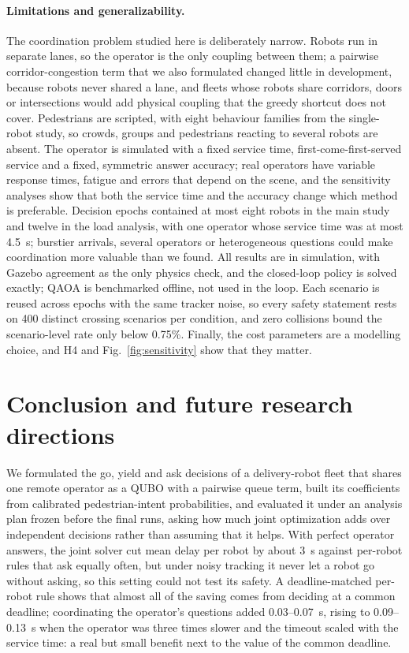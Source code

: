 \documentclass[a4paper,fleqn]{cas-dc}
\begin{document}
\paragraph{Limitations and generalizability.} The coordination problem studied here is deliberately narrow. Robots run in separate lanes, so the operator is the only coupling between them; a pairwise corridor-congestion term that we also formulated changed little in development, because robots never shared a lane, and fleets whose robots share corridors, doors or intersections would add physical coupling that the greedy shortcut does not cover. Pedestrians are scripted, with eight behaviour families from the single-robot study, so crowds, groups and pedestrians reacting to several robots are absent. The operator is simulated with a fixed service time, first-come-first-served service and a fixed, symmetric answer accuracy; real operators have variable response times, fatigue and errors that depend on the scene, and the sensitivity analyses show that both the service time and the accuracy change which method is preferable. Decision epochs contained at most eight robots in the main study and twelve in the load analysis, with one operator whose service time was at most \SI{4.5}{s}; burstier arrivals, several operators or heterogeneous questions could make coordination more valuable than we found. All results are in simulation, with Gazebo agreement as the only physics check, and the closed-loop policy is solved exactly; QAOA is benchmarked offline, not used in the loop. Each scenario is reused across epochs with the same tracker noise, so every safety statement rests on 400 distinct crossing scenarios per condition, and zero collisions bound the scenario-level rate only below 0.75\%. Finally, the cost parameters are a modelling choice, and H4 and Fig.~\ref{fig:sensitivity} show that they matter.

\section{Conclusion and future research directions}
\label{sec:conclusion}

We formulated the go, yield and ask decisions of a delivery-robot fleet that shares one remote operator as a QUBO with a pairwise queue term, built its coefficients from calibrated pedestrian-intent probabilities, and evaluated it under an analysis plan frozen before the final runs, asking how much joint optimization adds over independent decisions rather than assuming that it helps. With perfect operator answers, the joint solver cut mean delay per robot by about \SI{3}{s} against per-robot rules that ask equally often, but under noisy tracking it never let a robot go without asking, so this setting could not test its safety. A deadline-matched per-robot rule shows that almost all of the saving comes from deciding at a common deadline; coordinating the operator's questions added 0.03--\SI{0.07}{s}, rising to 0.09--\SI{0.13}{s} when the operator was three times slower and the timeout scaled with the service time: a real but small benefit next to the value of the common deadline.
\end{document}
